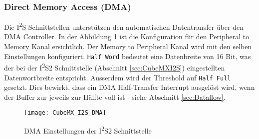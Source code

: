 \subsubsection{Direct Memory Access (DMA)}
\label{sec:CubeMXDMA}

Die I\textsuperscript{2}S Schnittstellen unterstützen den automatischen Datentransfer über den DMA Controller. In der Abbildung \ref{pic:CubeMX_I2S_DMA} ist die Konfiguration für den Peripheral to Memory Kanal ersichtlich. Der Memory to Peripheral Kanal wird mit den selben Einstellungen konfiguriert. \texttt{Half Word} bedeutet eine Datenbreite von 16 Bit, was der bei der I\textsuperscript{2}S2 Schnittstelle (Abschnitt \ref{sec:CubeMXI2S}) eingestellten Datenwortbreite entspricht.
Ausserdem wird der Threshold auf \texttt{Half Full} gesetzt. Dies bewirkt, dass ein DMA Half-Transfer Interrupt ausgelöst wird, wenn der Buffer zur jeweils zur Hälfte voll ist - siehe Abschnitt \ref{sec:Dataflow}.

\begin{figure}[H]
	\centering
	\texttt{[image: CubeMX\_I2S\_DMA]}
	\caption{DMA Einstellungen der I\textsuperscript{2}S2 Schnittstelle}
	\label{pic:CubeMX_I2S_DMA}
\end{figure}

